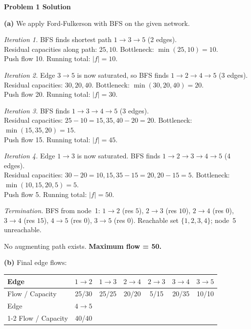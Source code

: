 \documentclass[11pt,a4paper]{article}
\begin{document}
\bigskip

\textbf{\large Problem 1 Solution}
\medskip

\textbf{(a)} We apply Ford-Fulkerson with BFS on the given network.

\textit{Iteration 1.} BFS finds shortest path $1 \to 3 \to 5$ (2 edges).\\
Residual capacities along path: $25, 10$. Bottleneck: $\min(25, 10) = 10$.\\
Push flow 10. Running total: $|f| = 10$.

\textit{Iteration 2.} Edge $3\to 5$ is now saturated, so BFS finds $1 \to 2 \to 4 \to 5$ (3 edges).\\
Residual capacities: $30, 20, 40$. Bottleneck: $\min(30, 20, 40) = 20$.\\
Push flow 20. Running total: $|f| = 30$.

\textit{Iteration 3.} BFS finds $1 \to 3 \to 4 \to 5$ (3 edges).\\
Residual capacities: $25-10=15, 35, 40-20=20$. Bottleneck: $\min(15, 35, 20) = 15$.\\
Push flow 15. Running total: $|f| = 45$.

\textit{Iteration 4.} Edge $1\to 3$ is now saturated. BFS finds $1 \to 2 \to 3 \to 4 \to 5$ (4 edges).\\
Residual capacities: $30-20=10, 15, 35-15=20, 20-15=5$. Bottleneck: $\min(10, 15, 20, 5) = 5$.\\
Push flow 5. Running total: $|f| = 50$.

\textit{Termination.} BFS from node~1: $1\to 2$ (res $5$), $2\to 3$ (res $10$), $2\to 4$ (res $0$), $3\to 4$ (res $15$), $4\to 5$ (res $0$), $3\to 5$ (res $0$). Reachable set $\{1,2,3,4\}$; node~5 unreachable.

No augmenting path exists. \textbf{Maximum flow = 50.}

\medskip

\textbf{(b)} Final edge flows:

\begin{center}
\begin{tabular}{lcccccc}
Edge & $1\to 2$ & $1\to 3$ & $2\to 4$ & $2\to 3$ & $3\to 4$ & $3\to 5$ \\
\hline
Flow / Capacity & 25/30 & 25/25 & 20/20 & 5/15 & 20/35 & 10/10 \\[4pt]
Edge & $4\to 5$ \\
\cline{1-2}
Flow / Capacity & 40/40
\end{tabular}
\end{center}
\end{document}
